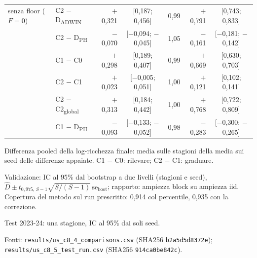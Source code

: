 \begin{table}[htbp]
\begin{tabular}{llrcrrc}
\midrule
senza floor ($F = 0$) & C2 $-$ D\textsubscript{ADWIN} & $+$0,321 & [0,187; 0,456] & 0,99 & $+$0,791 & [0,743; 0,833] \\
 & C2 $-$ D\textsubscript{PH} & $-$0,070 & [$-$0,094; $-$0,045] & 1,05 & $-$0,161 & [$-$0,181; $-$0,142] \\
 & C1 $-$ C0 & $+$0,298 & [0,189; 0,407] & 0,99 & $+$0,669 & [0,630; 0,703] \\
 & C2 $-$ C1 & $+$0,023 & [$-$0,005; 0,051] & 1,00 & $+$0,121 & [0,102; 0,141] \\
 & C2 $-$ C2\textsubscript{global} & $+$0,313 & [0,184; 0,442] & 1,00 & $+$0,768 & [0,722; 0,809] \\
 & C1 $-$ D\textsubscript{PH} & $-$0,093 & [$-$0,133; $-$0,052] & 0,98 & $-$0,283 & [$-$0,300; $-$0,265] \\
\bottomrule
\end{tabular}

\smallskip
\begin{minipage}{\linewidth}
\footnotesize
Differenza pooled della log-ricchezza finale: media sulle stagioni della media sui seed delle differenze appaiate. C1 $-$ C0: rilevare; C2 $-$ C1: graduare.\par
Validazione: IC al 95\% dal bootstrap a due livelli (stagioni e seed), $\hat D \pm t_{0{,}975,\,S-1}\sqrt{S/(S-1)}\,\mathrm{se}_{\mathrm{boot}}$; rapporto: ampiezza block su ampiezza iid. Copertura del metodo sul run prescritto: 0,914 col percentile, 0,935 con la correzione.\par
Test 2023-24: una stagione, IC al 95\% dai soli seed.\par
Fonti: \texttt{results/us\_c8\_4\_comparisons.csv} (SHA256 \texttt{b2a5d5d8372e}); \texttt{results/us\_c8\_5\_test\_run.csv} (SHA256 \texttt{914ca0be842c}).
\end{minipage}
\end{table}
